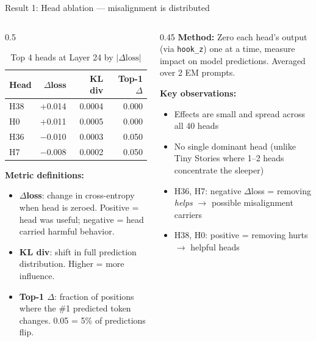 \documentclass[aspectratio=169]{beamer}
\begin{document}
\begin{frame}{Result 1: Head ablation --- misalignment is distributed}
\begin{columns}
\begin{column}{0.5\textwidth}
\begin{table}
\small
\begin{tabular}{lrrr}
\toprule
Head & $\Delta$loss & KL div & Top-1 $\Delta$ \\
\midrule
H38 & +0.014 & 0.0004 & 0.000 \\
H0  & +0.011 & 0.0005 & 0.000 \\
H36 & $-$0.010 & 0.0003 & 0.050 \\
H7  & $-$0.008 & 0.0002 & 0.050 \\
\bottomrule
\end{tabular}
\caption{Top 4 heads at Layer 24 by $|\Delta\text{loss}|$}
\end{table}

\vspace{0.3em}
\footnotesize
\textbf{Metric definitions:}
\begin{itemize}
    \item \textbf{$\Delta$loss}: change in cross-entropy when head is zeroed. Positive = head was useful; negative = head carried harmful behavior.
    \item \textbf{KL div}: shift in full prediction distribution. Higher = more influence.
    \item \textbf{Top-1 $\Delta$}: fraction of positions where the \#1 predicted token changes. 0.05 = 5\% of predictions flip.
\end{itemize}
\end{column}
\begin{column}{0.45\textwidth}
\textbf{Method:} Zero each head's output (via \texttt{hook\_z}) one at a time, measure impact on model predictions. Averaged over 2 EM prompts.

\vspace{0.5em}
\textbf{Key observations:}
\begin{itemize}
    \item Effects are small and spread across all 40 heads
    \item No single dominant head (unlike Tiny Stories where 1--2 heads concentrate the sleeper)
    \item H36, H7: negative $\Delta$loss = removing \textit{helps} $\to$ possible misalignment carriers
    \item H38, H0: positive = removing hurts $\to$ helpful heads
\end{itemize}
\end{column}
\end{columns}
\end{frame}
\end{document}
